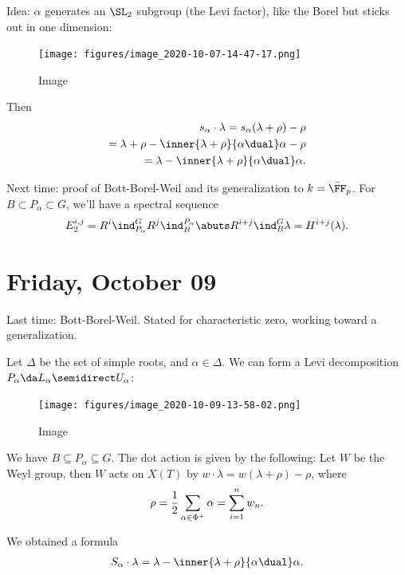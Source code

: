 Idea: \(\alpha\) generates an \(\SL_2\) subgroup (the Levi factor), like
the Borel but sticks out in one dimension:

\begin{figure}
\centering
\texttt{[image: figures/image\_2020-10-07-14-47-17.png]}
\caption{Image}
\end{figure}

Then
\begin{align*} 
s_\alpha \cdot \lambda = s_\alpha(\lambda + \rho) - \rho \\
= \lambda + \rho - \inner{\lambda + \rho}{\alpha\dual}\alpha - \rho \\
= \lambda - \inner{\lambda + \rho}{\alpha\dual}\alpha
.\end{align*}

Next time: proof of Bott-Borel-Weil and its generalization to
\(k = \bar{\FF}_p\). For \(B\subset P_\alpha \subset G\), we'll have a
spectral sequence
\begin{align*}  
E_2^{i, j} = R^i \ind_{P_\alpha}^G R^j \ind_B^{P_\alpha}  \abuts R^{i+j} \ind_B^G  \lambda = H^{i+j}(\lambda)
.\end{align*}

\hypertarget{friday-october-09}{%
\section{Friday, October 09}\label{friday-october-09}}

Last time: Bott-Borel-Weil. Stated for characteristic zero, working
toward a generalization.

Let \(\Delta\) be the set of simple roots, and \(\alpha\in \Delta\). We
can form a Levi decomposition
\(P_\alpha \da L_\alpha \semidirect U_\alpha\):

\begin{figure}
\centering
\texttt{[image: figures/image\_2020-10-09-13-58-02.png]}
\caption{Image}
\end{figure}

We have \(B \subseteq P_\alpha \subseteq G\). The dot action is given by
the following: Let \(W\) be the Weyl group, then \(W\) acts on \(X(T)\)
by \(w\cdot \lambda = w(\lambda + \rho) - \rho\), where
\begin{align*}  
\rho = {1\over 2} \sum_{\alpha\in \Phi^+} \alpha = \sum_{i=1}^n w_n
.\end{align*}

We obtained a formula
\begin{align*}  
S_\alpha \cdot \lambda = \lambda - \inner{\lambda  + \rho}{\alpha\dual} \alpha
.\end{align*}

